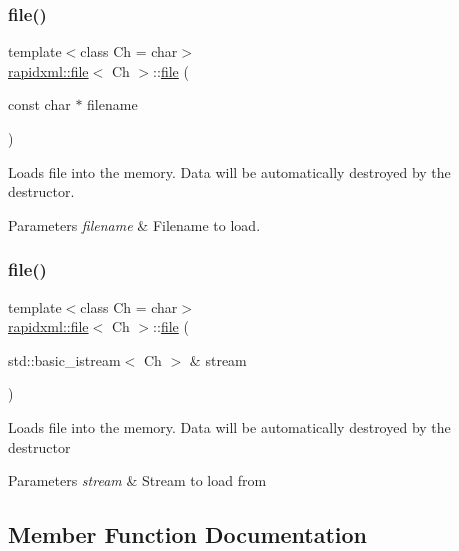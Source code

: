 \subsubsection{\texorpdfstring{file()}{file()}\hspace{0.1cm}{\footnotesize\ttfamily [1/2]}}
{\footnotesize\ttfamily template$<$class Ch  = char$>$ \\
\mbox{\hyperlink{classrapidxml_1_1file}{rapidxml\+::file}}$<$ Ch $>$\+::\mbox{\hyperlink{classrapidxml_1_1file}{file}} (\begin{DoxyParamCaption}\item[{const char $\ast$}]{filename }\end{DoxyParamCaption})\hspace{0.3cm}{\ttfamily [inline]}}

Loads file into the memory. Data will be automatically destroyed by the destructor. 
\begin{DoxyParams}{Parameters}
{\em filename} & Filename to load. \\
\hline
\end{DoxyParams}
\mbox{\label{classrapidxml_1_1file_a90707ccd991cc392dcf4bef37eed9d1f}} 
\subsubsection{\texorpdfstring{file()}{file()}\hspace{0.1cm}{\footnotesize\ttfamily [2/2]}}
{\footnotesize\ttfamily template$<$class Ch  = char$>$ \\
\mbox{\hyperlink{classrapidxml_1_1file}{rapidxml\+::file}}$<$ Ch $>$\+::\mbox{\hyperlink{classrapidxml_1_1file}{file}} (\begin{DoxyParamCaption}\item[{std\+::basic\+\_\+istream$<$ Ch $>$ \&}]{stream }\end{DoxyParamCaption})\hspace{0.3cm}{\ttfamily [inline]}}

Loads file into the memory. Data will be automatically destroyed by the destructor 
\begin{DoxyParams}{Parameters}
{\em stream} & Stream to load from \\
\hline
\end{DoxyParams}


\subsection{Member Function Documentation}
\mbox{\label{classrapidxml_1_1file_af1c71d65862c7af14e4708e32a80c1de}} 
